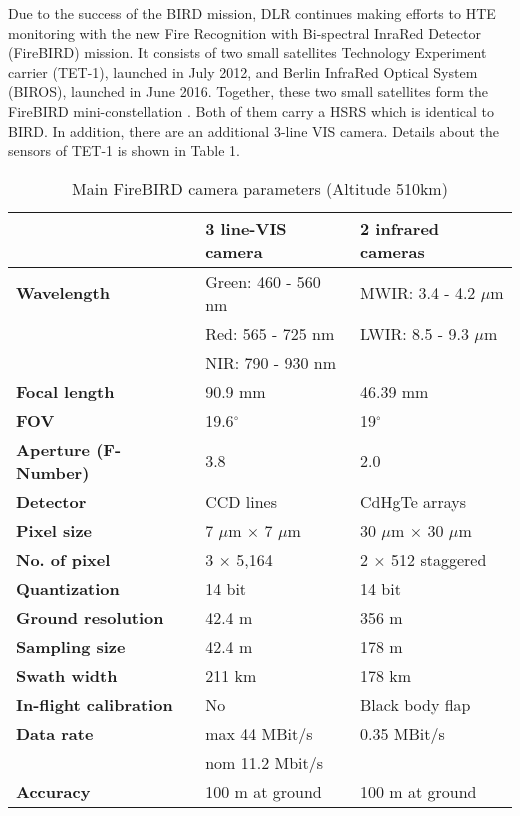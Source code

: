 \noindent Due to the success of the BIRD mission, DLR continues making efforts to HTE monitoring with the new Fire Recognition with Bi-spectral InraRed Detector (FireBIRD) mission. It consists of two small satellites Technology Experiment carrier (TET-1), launched in July 2012, and Berlin InfraRed Optical System (BIROS), launched in June 2016. Together, these two small satellites form the FireBIRD mini-constellation \parencite{Reference10}. Both of them carry a HSRS which is identical to BIRD. In addition, there are an additional 3-line VIS camera. Details about the sensors of TET-1 is shown in Table 1.\\

\begin{table}[!ht]
\caption{Main FireBIRD camera parameters (Altitude 510km) \parencite{Reference11}}
\centering
\begin{tabular} {l|l|l}
 \hline\hline
   & \textbf{3 line-VIS camera} & \textbf{2 infrared cameras} \\
 \hline
 \textbf{Wavelength} & Green: 460 - 560 nm  & MWIR: 3.4 - 4.2 $\mu$m \\
  & Red: 565 - 725 nm & LWIR: 8.5 - 9.3 $\mu$m \\
  & NIR: 790 - 930 nm & \\ 
 \hline
 \textbf{Focal length} & 90.9 mm & 46.39 mm \\
 \hline
 \textbf{FOV} & 19.6$^\circ$ & 19$^\circ$ \\
 \hline
 \textbf{Aperture (F-Number)} & 3.8 & 2.0 \\
 \hline
 \textbf{Detector} & CCD lines & CdHgTe arrays \\
 \hline
 \textbf{Pixel size} & 7 $\mu$m $\times$ 7 $\mu$m & 30 $\mu$m $\times$ 30 $\mu$m \\
 \hline
 \textbf{No. of pixel} & 3 $\times$ 5,164 & 2 $\times$ 512 staggered \\
 \hline
 \textbf{Quantization} & 14 bit & 14 bit \\
 \hline
 \textbf{Ground resolution} & 42.4 m & 356 m \\
 \hline
 \textbf{Sampling size} & 42.4 m & 178 m \\
 \hline
 \textbf{Swath width} & 211 km & 178 km \\
 \hline
 \textbf{In-flight calibration} & No & Black body flap \\
 \hline
 \textbf{Data rate} & max 44 MBit/s & 0.35 MBit/s \\
  & nom 11.2 Mbit/s & \\
 \hline
 \textbf{Accuracy} & 100 m at ground & 100 m at ground \\
 \hline\hline
\end{tabular}
\label{ParaFireBIRD}
\end{table}

